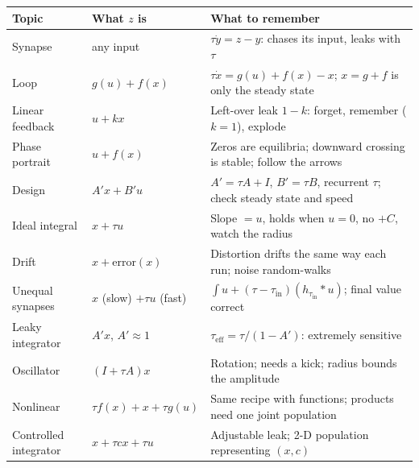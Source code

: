 \documentclass[11pt,letterpaper]{article}
\newcommand{\tin}{\tau_{\mathrm{in}}}
\begin{document}
\begin{center}
\renewcommand{\arraystretch}{1.25}
\begin{tabular}{@{}p{}p{}p{}@{}}
\toprule
Topic & What $z$ is & What to remember \\
\midrule
Synapse & any input & $\tau\dot y = z - y$: chases its input, leaks with $\tau$ \\
Loop & $g(u) + f(x)$ & $\tau\dot x = g(u) + f(x) - x$; $x = g + f$ is only the steady state \\
Linear feedback & $u + kx$ & Left-over leak $1 - k$: forget, remember ($k = 1$), explode \\
Phase portrait & $u + f(x)$ & Zeros are equilibria; downward crossing is stable; follow the arrows \\
Design & $A'x + B'u$ & $A' = \tau A + I$, $B' = \tau B$, recurrent $\tau$; check steady state and speed \\
Ideal integral & $x + \tau u$ & Slope $= u$, holds when $u = 0$, no $+C$, watch the radius \\
Drift & $x + \mathrm{error}(x)$ & Distortion drifts the same way each run; noise random-walks \\
Unequal synapses & $x$ (slow) $+ \tau u$ (fast) & $\int u + (\tau - \tin)(h_{\tin} * u)$; final value correct \\
Leaky integrator & $A'x$, $A' \approx 1$ & $\tau_{\mathrm{eff}} = \tau/(1 - A')$: extremely sensitive \\
Oscillator & $(I + \tau A)x$ & Rotation; needs a kick; radius bounds the amplitude \\
Nonlinear & $\tau f(x) + x + \tau g(u)$ & Same recipe with functions; products need one joint population \\
Controlled integrator & $x + \tau c x + \tau u$ & Adjustable leak; 2-D population representing $(x, c)$ \\
\bottomrule
\end{tabular}
\end{center}
\end{document}
